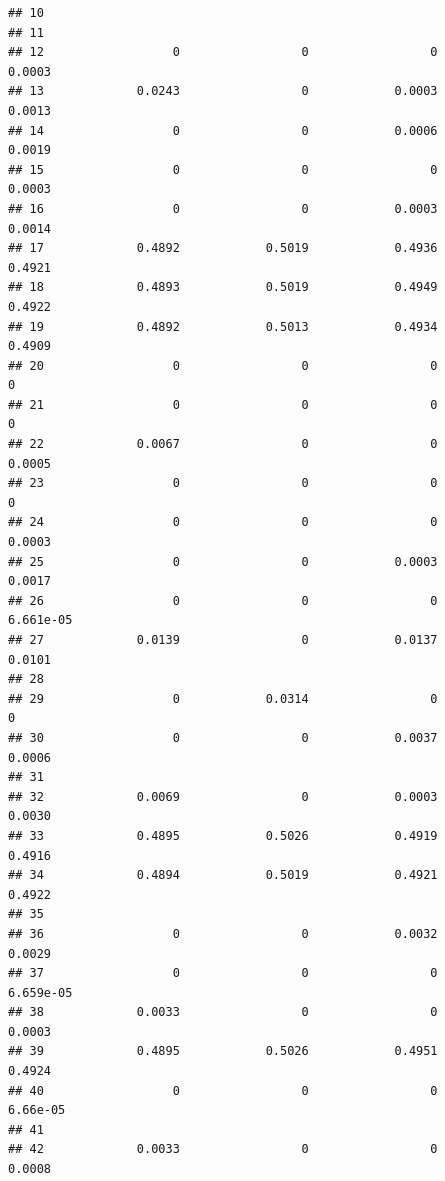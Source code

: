 \documentclass[
]{article}
\begin{document}
\begin{verbatim}
## 10                                                                         
## 11                                                                         
## 12                  0                 0                 0            0.0003
## 13             0.0243                 0            0.0003            0.0013
## 14                  0                 0            0.0006            0.0019
## 15                  0                 0                 0            0.0003
## 16                  0                 0            0.0003            0.0014
## 17             0.4892            0.5019            0.4936            0.4921
## 18             0.4893            0.5019            0.4949            0.4922
## 19             0.4892            0.5013            0.4934            0.4909
## 20                  0                 0                 0                 0
## 21                  0                 0                 0                 0
## 22             0.0067                 0                 0            0.0005
## 23                  0                 0                 0                 0
## 24                  0                 0                 0            0.0003
## 25                  0                 0            0.0003            0.0017
## 26                  0                 0                 0         6.661e-05
## 27             0.0139                 0            0.0137            0.0101
## 28                                                                         
## 29                  0            0.0314                 0                 0
## 30                  0                 0            0.0037            0.0006
## 31                                                                         
## 32             0.0069                 0            0.0003            0.0030
## 33             0.4895            0.5026            0.4919            0.4916
## 34             0.4894            0.5019            0.4921            0.4922
## 35                                                                         
## 36                  0                 0            0.0032            0.0029
## 37                  0                 0                 0         6.659e-05
## 38             0.0033                 0                 0            0.0003
## 39             0.4895            0.5026            0.4951            0.4924
## 40                  0                 0                 0          6.66e-05
## 41                                                                         
## 42             0.0033                 0                 0            0.0008

\end{verbatim}
\end{document}
